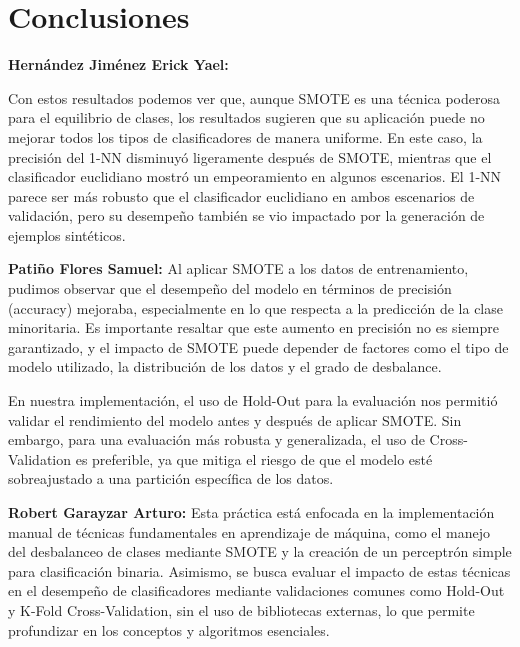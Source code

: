 \section{Conclusiones} 
    
\textbf{\Large Hernández Jiménez Erick Yael:}

Con estos resultados podemos ver que, aunque SMOTE es una técnica poderosa para el equilibrio de clases, los resultados sugieren que su aplicación puede no mejorar todos los tipos de clasificadores de manera uniforme. En este caso, la precisión del 1-NN disminuyó ligeramente después de SMOTE, mientras que el clasificador euclidiano mostró un empeoramiento en algunos escenarios. El 1-NN parece ser más robusto que el clasificador euclidiano en ambos escenarios de validación, pero su desempeño también se vio impactado por la generación de ejemplos sintéticos.

\textbf{\Large Patiño Flores Samuel:}
Al aplicar SMOTE a los datos de entrenamiento, pudimos observar que el desempeño del modelo en términos de precisión (accuracy) mejoraba, especialmente en lo que respecta a la predicción de la clase minoritaria. Es importante resaltar que este aumento en precisión no es siempre garantizado, y el impacto de SMOTE puede depender de factores como el tipo de modelo utilizado, la distribución de los datos y el grado de desbalance.

En nuestra implementación, el uso de Hold-Out para la evaluación nos permitió validar el rendimiento del modelo antes y después de aplicar SMOTE. Sin embargo, para una evaluación más robusta y generalizada, el uso de Cross-Validation es preferible, ya que mitiga el riesgo de que el modelo esté sobreajustado a una partición específica de los datos.

\textbf{\Large Robert Garayzar Arturo:}
Esta práctica está enfocada en la implementación manual de técnicas fundamentales en aprendizaje de máquina, como el manejo del desbalanceo de clases mediante SMOTE y la creación de un perceptrón simple para clasificación binaria. Asimismo, se busca evaluar el impacto de estas técnicas en el desempeño de clasificadores mediante validaciones comunes como Hold-Out y K-Fold Cross-Validation, sin el uso de bibliotecas externas, lo que permite profundizar en los conceptos y algoritmos esenciales.